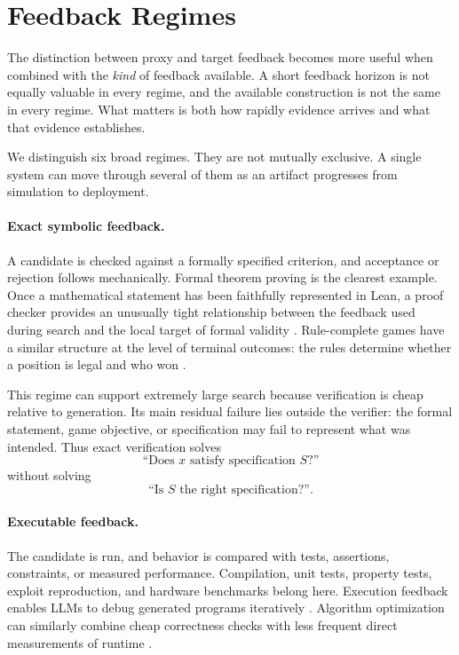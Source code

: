 \section{Feedback Regimes}
\label{sec:feedback-regimes}

The distinction between proxy and target feedback becomes more useful when combined
with the \emph{kind} of feedback available.  A short feedback horizon is not equally
valuable in every regime, and the available construction is not the same in every
regime.  What matters is both how rapidly evidence arrives and what that evidence
establishes.

We distinguish six broad regimes.  They are not mutually exclusive.  A single system
can move through several of them as an artifact progresses from simulation to
deployment.

\paragraph{Exact symbolic feedback.}
A candidate is checked against a formally specified criterion, and acceptance or
rejection follows mechanically.  Formal theorem proving is the clearest example.
Once a mathematical statement has been faithfully represented in Lean, a proof
checker provides an unusually tight relationship between the feedback used during
search and the local target of formal validity
\parencite{hubert2025alphaproof}.  Rule-complete games have a similar structure at the
level of terminal outcomes: the rules determine whether a position is legal and who
won \parencite{silver2017alphagozero}.

This regime can support extremely large search because verification is cheap relative
to generation.  Its main residual failure lies outside the verifier: the formal
statement, game objective, or specification may fail to represent what was intended.
Thus exact verification solves
\[
    \text{``Does \(x\) satisfy specification \(S\)?''}
\]
without solving
\[
    \text{``Is \(S\) the right specification?''}.
\]

\paragraph{Executable feedback.}
The candidate is run, and behavior is compared with tests, assertions, constraints, or
measured performance.  Compilation, unit tests, property tests, exploit reproduction,
and hardware benchmarks belong here.  Execution feedback enables LLMs to debug
generated programs iteratively \parencite{chen2023selfdebug}.  Algorithm optimization can
similarly combine cheap correctness checks with less frequent direct measurements of
runtime \parencite{mankowitz2023alphadev}.


